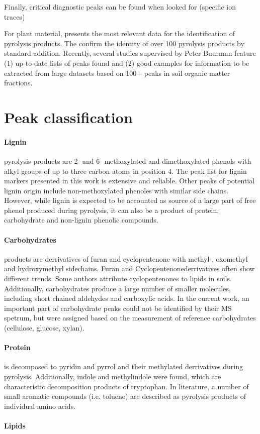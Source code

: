 Finally, critical diagnostic peaks can be found when looked for (specific ion traces)

For plant material, \cite{Ralph1991} presents the most relevant data for the identification of pyrolysis products. The confirm the identity of over 100 pyrolysis products by standard addition. Recently, several studies supervised by Peter Buurman \citep{Schellekens2009,Buurman2010, Vancampenhout2009 } feature (1) up-to-date lists of peaks found and (2) good examples for information to be extracted from large datasets based on 100+ peaks in soil organic matter fractions.

\section{Peak classification}

\paragraph{Lignin} pyrolysis products are 2- and 6- methoxylated and dimethoxylated phenols with alkyl groups of up to three carbon atoms in position 4. The peak list for lignin markers presented in this work is extensive and reliable. Other peaks of potential lignin origin include non-methoxylated phenoles with similar side chains. However, while lignin is expected to be accounted as source of a large part of free phenol produced during pyrolysis, it can also be a product of protein, carbohydrate and non-lignin phenolic compounds.

\paragraph{Carbohydrates} products are derrivatives of furan and cyclopentenone with methyl-, oxomethyl and hydroxymethyl sidechains. Furan and Cyclopentenonederrivatives often show different trends. Some authors attribute cyclopentenones to lipids in soils. Additionally, carbohydrates produce a large number of smaller molecules, including short chained aldehydes and carboxylic acids. In the current work, an important part of carbohydrate peaks could not be identified by their MS spetrum, but were assigned based on the measurement of reference carbohydrates (cellulose, glucose, xylan).

\paragraph{Protein} is decomposed to pyridin and pyrrol and their methylated derrivatives during pyrolysis. Additionally, indole and methylindole were found, which are characteristic decomposition products of tryptophan. In literature, a number of small aromatic compounds (i.e. toluene) are described as pyrolysis products of individual amino acids. 

\paragraph{Lipids}